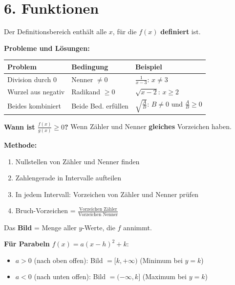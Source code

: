 \documentclass[10pt, a4paper]{article}
\begin{document}
\section*{6. Funktionen}

\begin{defbox}
Der Definitionsbereich enth\"alt alle $x$, f\"ur die $f(x)$ \textbf{definiert} ist.

\textbf{Probleme und L\"osungen:}
\renewcommand{\arraystretch}{1.5}
\begin{tabular}{lll}
    \textbf{Problem} & \textbf{Bedingung} & \textbf{Beispiel} \\
    \hline
    Division durch 0 & Nenner $\neq 0$ & $\frac{1}{x-3}$: $x \neq 3$ \\
    Wurzel aus negativ & Radikand $\geq 0$ & $\sqrt{x-2}$: $x \geq 2$ \\
    Beides kombiniert & Beide Bed. erf\"ullen & $\sqrt{\frac{A}{B}}$: $B \neq 0$ und $\frac{A}{B} \geq 0$
\end{tabular}
\end{defbox}

\begin{defbox}
\textbf{Wann ist $\frac{f(x)}{g(x)} \geq 0$?} Wenn Z\"ahler und Nenner \textbf{gleiches} Vorzeichen haben.

\textbf{Methode:}
\begin{enumerate}
    \item Nullstellen von Z\"ahler und Nenner finden
    \item Zahlengerade in Intervalle aufteilen
    \item In jedem Intervall: Vorzeichen von Z\"ahler und Nenner pr\"ufen
    \item Bruch-Vorzeichen = $\frac{\text{Vorzeichen Z\"ahler}}{\text{Vorzeichen Nenner}}$
\end{enumerate}
\end{defbox}

\begin{defbox}
Das \textbf{Bild} = Menge aller $y$-Werte, die $f$ annimmt.

\textbf{F\"ur Parabeln} $f(x) = a(x - h)^2 + k$:
\begin{itemize}
    \item $a > 0$ (nach oben offen): Bild $= [k, +\infty)$ \quad (Minimum bei $y = k$)
    \item $a < 0$ (nach unten offen): Bild $= (-\infty, k]$ \quad (Maximum bei $y = k$)
\end{itemize}
\end{defbox}
\end{document}
